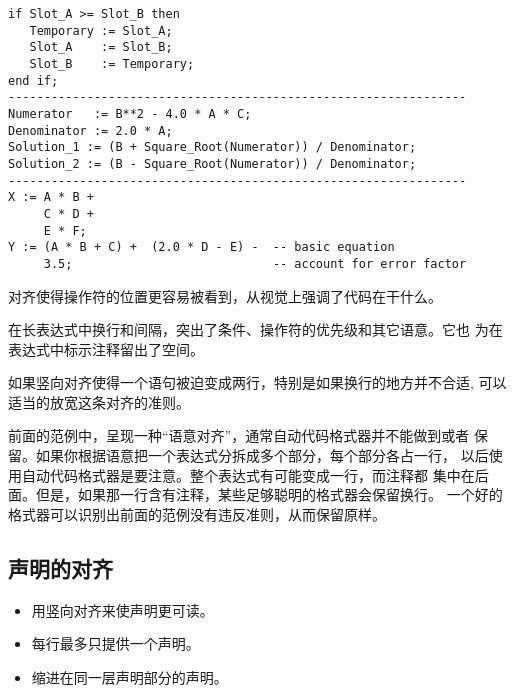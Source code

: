 \begin{blockindent}
\noindent
\begin{lstlisting}
if Slot_A >= Slot_B then
   Temporary := Slot_A;
   Slot_A    := Slot_B;
   Slot_B    := Temporary;
end if;
----------------------------------------------------------------
Numerator   := B**2 - 4.0 * A * C;
Denominator := 2.0 * A;
Solution_1 := (B + Square_Root(Numerator)) / Denominator;
Solution_2 := (B - Square_Root(Numerator)) / Denominator;
----------------------------------------------------------------
X := A * B +
     C * D +
     E * F;
Y := (A * B + C) +  (2.0 * D - E) -  -- basic equation
     3.5;                            -- account for error factor
\end{lstlisting}
\end{blockindent}

\begin{blockindent}
对齐使得操作符的位置更容易被看到，从视觉上强调了代码在干什么。

在长表达式中换行和间隔，突出了条件、操作符的优先级和其它语意。它也
为在表达式中标示注释留出了空间。
\end{blockindent}

\begin{blockindent}
如果竖向对齐使得一个语句被迫变成两行，特别是如果换行的地方并不合适,
可以适当的放宽这条对齐的准则。
\end{blockindent}

\begin{blockindent}
前面的范例中，呈现一种``语意对齐''，通常自动代码格式器并不能做到或者
保留。如果你根据语意把一个表达式分拆成多个部分，每个部分各占一行，
以后使用自动代码格式器是要注意。整个表达式有可能变成一行，而注释都
集中在后面。但是，如果那一行含有注释，某些足够聪明的格式器会保留换行。
一个好的格式器可以识别出前面的范例没有违反准则，从而保留原样。
\end{blockindent}

\subsection{声明的对齐}
\label{s:src:decl-align}
\begin{itemize}
    \item 用竖向对齐来使声明更可读。
    \item 每行最多只提供一个声明。
    \item 缩进在同一层声明部分的声明。
\end{itemize}

